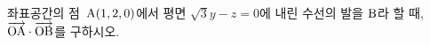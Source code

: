 좌표공간의 점~$\mathrm{A}(1{,}\mkern3mu\mathopen{}2{,}\mkern3mu\mathopen{}0)$에서 평면 $\sqrt{3}y-z=0$에 내린 수선의 발을 $\mathrm{B}$라 할 때, $\overrightarrow{\mathrm{OA}}\cdot\overrightarrow{\mathrm{OB}}$를 구하시오. 
